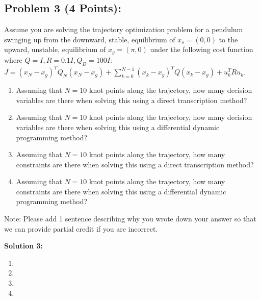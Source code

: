 \documentclass[]{article}
\begin{document}
\clearpage
\subsection*{Problem 3 (4 Points):}
Assume you are solving the trajectory optimization problem for a pendulum swinging up from the downward, stable, equilibrium of $x_s = (0,0)$ to the upward, unstable, equilibrium of $x_g = (\pi,0)$ under the following cost function where $Q=I, R = 0.1I, Q_D = 100I$:\\ $J = (x_N-x_g)^TQ_N(x_N-x_g) + \sum_{k=0}^{N-1} (x_k-x_g)^TQ(x_k-x_g) + u_k^TRu_k$.

\begin{enumerate}[label=(\alph*)]
    \item Assuming that $N=10$ knot points along the trajectory, how many decision variables are there when solving this using a direct transcription method?
    \item Assuming that $N=10$ knot points along the trajectory, how many decision variables are there when solving this using a differential dynamic programming method?
    \item Assuming that $N=10$ knot points along the trajectory, how many constraints are there when solving this using a direct transcription method?
    \item Assuming that $N=10$ knot points along the trajectory, how many constraints are there when solving this using a differential dynamic programming method?
\end{enumerate}

Note: Please add 1 sentence describing why you wrote down your answer so that we can provide partial credit if you are incorrect.

\textbf{Solution 3:}
\begin{enumerate}[label=(\alph*)]
    \item %
    \item %
    \item %
    \item %
    
\end{enumerate}
\end{document}
